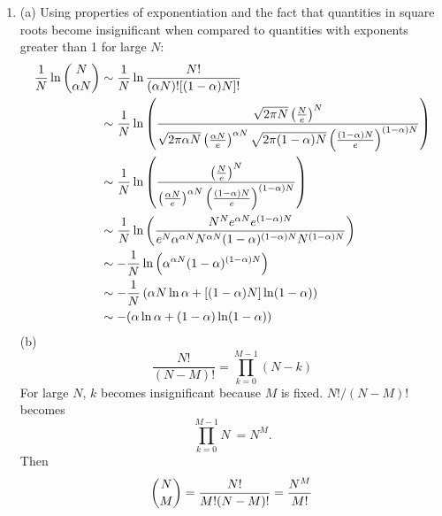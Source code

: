 \documentclass[a4paper,12pt]{article}
\begin{document}
\begin{enumerate}
\item
(a) Using properties of exponentiation and the fact that quantities in square roots become insignificant when compared to quantities with exponents greater than 1 for large $N$:
\begin{align*}
\frac{1}{N}\ln\dbinom{N}{\alpha N} &\sim \frac{1}{N}\ln\frac{N!}{(\alpha N)![(1 - \alpha)N]!} \\
&\sim \frac{1}{N}\ln\left(\frac{\sqrt{2\pi N}\left(\frac{N}{e}\right)^N}{\sqrt{2\pi \alpha N}\left(\frac{\alpha N}{e}\right)^{\alpha  N}\sqrt{2\pi(1-\alpha)N}\left(\frac{(1-\alpha)N}{e}\right)^{(1-\alpha)N}}\right) \\
&\sim \frac{1}{N}\ln\left(\frac{\left(\frac{N}{e}\right)^N}{\left(\frac{\alpha N}{e}\right)^{\alpha N}\left(\frac{(1-\alpha)N}{e}\right)^{(1-\alpha)N}}\right) \\
&\sim \frac{1}{N}\ln\left(\frac{N^Ne^{\alpha N}e^{(1-\alpha)N}}{e^N\alpha^{\alpha N}N^{\alpha N}(1-\alpha)^{(1-\alpha)N}N^{(1-\alpha)N}}\right) \\
&\sim -\frac{1}{N}\ln\left(\alpha^{\alpha N}(1-\alpha)^{(1-\alpha)N}\right) \\
&\sim -\frac{1}{N}\left(\alpha N \ln\alpha + [(1-\alpha)N] \ln(1-\alpha)\right) \\
&\sim -(\alpha\ln\alpha + (1-\alpha)\ln(1-\alpha))
\end{align*}
(b)
\[ \frac{N!}{(N-M)!} = \prod_{k=0}^{M-1} \left(N-k\right) \]
For large $N$, $k$ becomes insignificant because $M$ is fixed. $N!/(N-M)!$ becomes
\[ \prod_{k=0}^{M-1} N\ = N^M.\]
Then
\[ \dbinom{N}{M} = \frac{N!}{M!(N-M)!} = \frac{N^M}{M!} \]


\end{enumerate}
\end{document}
